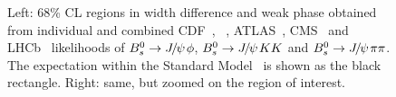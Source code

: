 


\begin{figure}
\begin{center}
\caption{
Left: 68\% CL regions in \Bs width difference \DGs and weak phase \phiccbars
obtained from individual and combined CDF~\cite{Aaltonen:2012ie,*CDF:2011af,*Aaltonen:2007he_mod,*Aaltonen:2007gf_mod},
\dzero~\cite{Abazov:2011ry,*Abazov_mod:2008fj,*Abazov:2007tx_mod_cont}, ATLAS~\cite{Aad:2014cqa,*Aad:2012kba_cont}, 
CMS~\cite{CMS-PAS-BPH-13-012}
and LHCb~\cite{LHCB-PAPER-2014-059,*Aaij:2013oba_supersede2,Aaij:2014dka,*Aaij:2013oba_supersede}
likelihoods of 
$B^0_s\to {J\mskip -3mu/\mskip -2mu\psi\mskip 2mu}\phi$, $B^0_s\to {J\mskip -3mu/\mskip -2mu\psi\mskip 2mu} KK$ and $B^0_s\to{J\mskip -3mu/\mskip -2mu\psi\mskip 2mu}\pi\pi$. 
The expectation within the Standard Model~\cite{Charles:2011va_mod,Lenz:2011ti,*Lenz:2006hd}
is shown as the black rectangle.
Right: same, but zoomed on the region of interest.
}
\end{center}
\end{figure}

